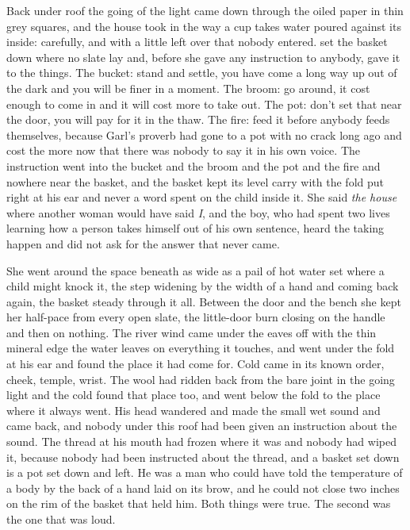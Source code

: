 Back under  roof the going of the light came down through the oiled paper in thin grey squares, and the house took  in the way a cup takes water poured against its inside: carefully, and with a little left over that nobody entered.  set the basket down where no slate lay and, before she gave any instruction to anybody, gave it to the things. The bucket: stand and settle, you have come a long way up out of the dark and you will be finer in a moment. The broom: go around, it cost enough to come in and it will cost more to take out. The pot: don't set that near the door, you will pay for it in the thaw. The fire: feed it before anybody feeds themselves, because Garl's proverb had gone to a pot with no crack long ago and cost the more now that there was nobody to say it in his own voice. The instruction went into the bucket and the broom and the pot and the fire and nowhere near the basket, and the basket kept its level carry with the fold put right at his ear and never a word spent on the child inside it. She said \emph{the house} where another woman would have said \emph{I}, and the boy, who had spent two lives learning how a person takes himself out of his own sentence, heard the taking happen and did not ask for the answer that never came.

She went around the space beneath  as wide as a pail of hot water set where a child might knock it, the step widening by the width of a hand and coming back again, the basket steady through it all. Between the door and the bench she kept her half-pace from every open slate, the little-door burn closing on the handle and then on nothing. The river wind came under the eaves off  with the thin mineral edge the water leaves on everything it touches, and went under the fold at his ear and found the place it had come for. Cold came in its known order, cheek, temple, wrist. The wool had ridden back from the bare joint in the going light and the cold found that place too, and went below the fold to the place where it always went. His head wandered and made the small wet sound and came back, and nobody under this roof had been given an instruction about the sound. The thread at his mouth had frozen where it was and nobody had wiped it, because nobody had been instructed about the thread, and a basket set down is a pot set down and left. He was a man who could have told the temperature of a body by the back of a hand laid on its brow, and he could not close two inches on the rim of the basket that held him. Both things were true. The second was the one that was loud.


